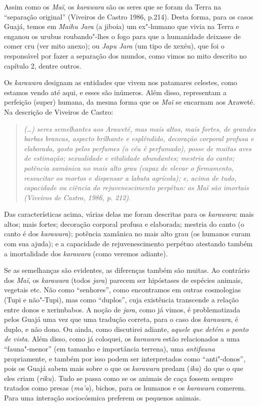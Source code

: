 Assim como os \emph{Maï}, os \emph{karawara} são os seres que se foram
da Terra na ``separação original'' (Viveiros de Castro 1986, p.214).
Desta forma, para os casos Guajá, temos em \emph{Maihu} \emph{Jara} (a
jiboia) um ex"-humano que vivia na Terra e enganou os urubus
roubando"-lhes o fogo para que a humanidade deixasse de comer cru (ver
mito anexo); ou \emph{Japu Jara} (um tipo de xexéu), que foi o
responsável por fazer a separação dos mundos, como vimos no mito
descrito no capítulo 2, dentre outros.

Os \emph{karawara} designam as entidades que vivem nos patamares
celestes, como estamos vendo até aqui, e esses são inúmeros. Além disso,
representam a perfeição (super) humana, da mesma forma que os \emph{Maï}
se encarnam aos Araweté. Na descrição de Viveiros de Castro:

\begin{quote}
\emph{(\ldots) seres semelhantes aos Araweté, mas mais altos, mais fortes, de
grandes barbas brancas, aspecto brilhante e esplêndido, decoração
corporal profusa e elaborada, gosto pelos perfumes (o céu é perfumado),
posse de muitas aves de estimação; sexualidade e vitalidade abundantes;
mestria do canto; potência xamânica no mais alto grau (capaz de elevar o
firmamento, ressucitar os mortos e dispensar a labuta agrícola); e,
acima de tudo, capacidade ou ciência do rejuvenescimento perpétuo: os
\emph{Maï} são imortais (Viveiros de Castro, 1986, p. 212)}.
\end{quote}

Das características acima, várias delas me foram descritas para os
\emph{karawara}: mais altos; mais fortes; decoração corporal profusa e
elaborada; mestria do canto (o canto é dos \emph{karawara}); potência
xamânica no mais alto grau (os humanos curam com sua ajuda); e a
capacidade de rejuvenescimento perpétuo atestando também a imortalidade
dos \emph{karawara} (como veremos adiante).

Se as semelhanças são evidentes, as diferenças também são muitas. Ao
contrário dos \emph{Maï}, os \emph{karawara} (todos \emph{jara}) parecem
ser hipóstases de espécies animais, vegetais etc. Não como ``senhores'',
como encontramos em outras cosmologias (Tupi e não"-Tupi), mas como
``duplos'', cuja existência transcende a relação entre donos e xerimbabos.
A noção de \emph{jara}, como já vimos, é problematizada pelos Guajá uma
vez que uma tradução correta, para o caso dos \emph{karawara}, é duplo,
e não dono. Ou ainda, como discutirei adiante, \emph{aquele que detém o
ponto de vista}. Além disso, como já coloquei, os \emph{karawara} estão
relacionados a uma ``fauna"-menor'' (em tamanho e importância terrena), uma
\emph{antifauna} propriamente, e também por isso podem ser interpretados
como ``anti"-donos'', pois os Guajá sabem mais sobre o que os
\emph{karawara} predam (\emph{ika}) do que o que eles criam
(\emph{riku}). Tudo se passa como se os animais de caça fossem sempre
tratados como presas (\emph{ma'a}), bichos, para os humanos e os
\emph{karawara} comerem. Para uma interação sociocósmica preferem os
pequenos animais.


